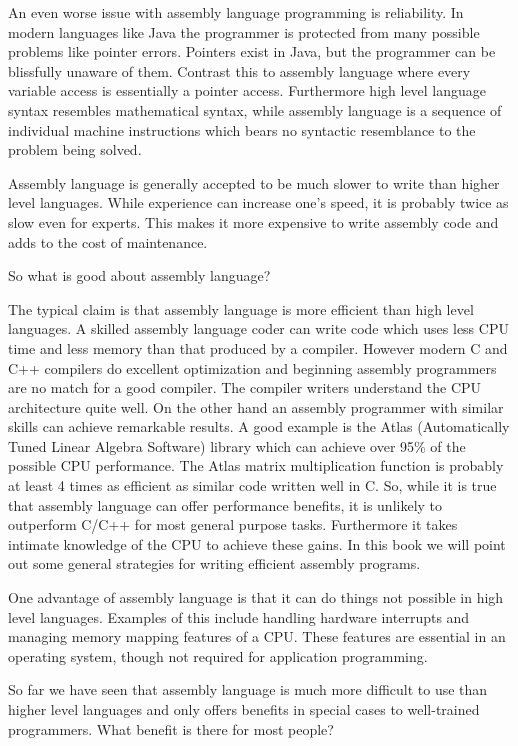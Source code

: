 \documentclass[11pt,b5paper]{book}
\begin{document}
An even worse issue with assembly language programming is reliability.
In modern languages like Java the programmer is protected from many possible
problems like pointer errors.
Pointers exist in Java, but the programmer can be blissfully unaware of them.
Contrast this to assembly language where every variable access is essentially
a pointer access.
Furthermore high level language syntax resembles mathematical syntax, while
assembly language is a sequence of individual machine instructions which bears
no syntactic resemblance to the problem being solved.

Assembly language is generally accepted to be much slower to write than 
higher level languages.
While experience can increase one's speed, it is probably twice as slow even
for experts.
This makes it more expensive to write assembly code and adds to the cost of maintenance.

So what is good about assembly language?

The typical claim is that assembly language is more efficient than high level
languages.
A skilled assembly language coder can write code which uses less CPU time and
less memory than that produced by a compiler.
However modern C and C++ compilers do excellent optimization and beginning
assembly programmers are no match for a good compiler.
The compiler writers understand the CPU architecture quite well.
On the other hand an assembly programmer with similar skills can achieve remarkable results.
A good example is the Atlas (Automatically Tuned Linear Algebra Software)
library which can achieve over 95\% of the possible CPU performance.
The Atlas  matrix multiplication function is probably at least 4 times as
efficient as similar code written well in C.
So, while it is true that assembly language can offer performance benefits, it
is unlikely to outperform C/C++ for most general purpose tasks.
Furthermore it takes intimate knowledge of the CPU to achieve these gains.
In this book we will point out some general strategies for writing efficient assembly programs.

One advantage of assembly language is that it can do things not possible in
high level languages.
Examples of this include handling hardware interrupts and managing memory
mapping features of a CPU.
These features are essential in an operating system, though not required for
application programming.

So far we have seen that assembly language is much more difficult to use than
higher level languages and only offers benefits in special cases to
well-trained programmers.
What benefit is there for most people?
\end{document}
